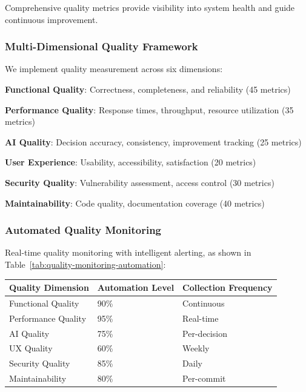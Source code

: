 Comprehensive quality metrics provide visibility into system health and guide continuous improvement.

\subsubsection*{Multi-Dimensional Quality Framework}

We implement quality measurement across six dimensions:

\begin{compactlist}
    \item \textbf{Functional Quality}: Correctness, completeness, and reliability (45 metrics)
    \item \textbf{Performance Quality}: Response times, throughput, resource utilization (35 metrics)
    \item \textbf{AI Quality}: Decision accuracy, consistency, improvement tracking (25 metrics)
    \item \textbf{User Experience}: Usability, accessibility, satisfaction (20 metrics)
    \item \textbf{Security Quality}: Vulnerability assessment, access control (30 metrics)
    \item \textbf{Maintainability}: Code quality, documentation coverage (40 metrics)
\end{compactlist}

\subsubsection*{Automated Quality Monitoring}

Real-time quality monitoring with intelligent alerting, as shown in Table~\ref{tab:quality-monitoring-automation}:

\begin{center}
\begin{tabular}{@{}lll@{}}
\toprule
\textbf{Quality Dimension} & \textbf{Automation Level} & \textbf{Collection Frequency} \\
\midrule
Functional Quality & 90\% & Continuous \\
Performance Quality & 95\% & Real-time \\
AI Quality & 75\% & Per-decision \\
UX Quality & 60\% & Weekly \\
Security Quality & 85\% & Daily \\
Maintainability & 80\% & Per-commit \\
\bottomrule
\end{tabular}
\label{tab:quality-monitoring-automation}
\end{center}

